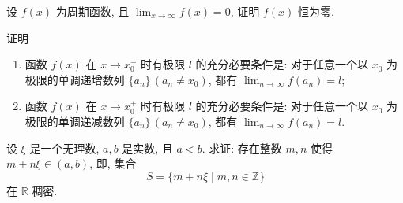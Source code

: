 \begin{exercise}[1.C.14]
    设 $f(x)$ 为周期函数, 且 $\lim_{x \to \infty} f(x) = 0$, 证明 $f(x)$ 恒为零.
\end{exercise}

\begin{exercise}[1.C.15]
    证明
    \begin{enumerate}
        \item 函数 $f(x)$ 在 $x \to x_0^-$ 时有极限 $l$ 的充分必要条件是: 对于任意一个以 $x_0$ 为极限的单调递增数列 $\{a_n\} \, (a_n \ne x_0)$, 都有 $\lim_{n \to \infty} f(a_n) = l$;
        \item 函数 $f(x)$ 在 $x \to x_0^+$ 时有极限 $l$ 的充分必要条件是: 对于任意一个以 $x_0$ 为极限的单调递减数列 $\{a_n\} \, (a_n \ne x_0)$, 都有 $\lim_{n \to \infty} f(a_n) = l$.
    \end{enumerate}
\end{exercise}

\begin{exercise}[1.C.16]
    设 $\xi$ 是一个无理数, $a,b$ 是实数, 且 $a<b$. 求证: 存在整数 $m,n$ 使得 $m+n\xi \in (a,b)$, 即, 集合
    $$ S = \{m+n\xi \mid m, n \in \mathbb{Z}\} $$
    在 $\mathbb{R}$ 稠密.
\end{exercise}